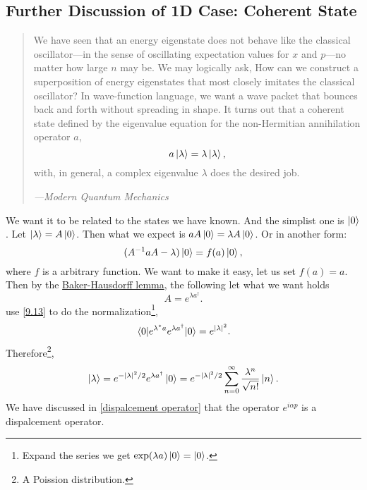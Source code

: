 \documentclass{article}
\theoremstyle{1}
\begin{document}
\subsection{Further Discussion of 1D Case: Coherent State}
\begin{quotation}
    We have seen that an energy eigenstate does not behave like the classical
oscillator—in the sense of oscillating expectation values for $x$ and $p$—no matter
how large $n$ may be. We may logically ask, How can we construct a superposition
of energy eigenstates that most closely imitates the classical oscillator? In wave-function language, we want a wave packet that bounces back and forth without
spreading in shape. It turns out that a coherent state defined by the eigenvalue
equation for the non-Hermitian annihilation operator $a$,
$$a\ket{\lambda}=\lambda\ket{\lambda},$$
with, in general, a complex eigenvalue $\lambda$ does the desired job. 
\begin{flushright}
    {\raggedleft \textit{---Modern Quantum Mechanics}}
\end{flushright}
\end{quotation}
We want it to be related to the states we have known. And the simplist one is $\ket{0}$. Let $\ket{\lambda}=A\ket{0}$. Then what we expect is $aA\ket{0}=\lambda A\ket{0}$. Or in another form:
\begin{equation*}
    (A^{-1}aA-\lambda)\ket{0}=f(a)\ket{0},
\end{equation*}
where $f$ is a arbitrary function. We want to make it easy, let us set $f(a)=a$. Then by the \hyperref[Baker-Hausdorff lemma]{Baker-Hausdorff lemma}, the following let what we want holds
\begin{equation}
    A=e^{\lambda a^\dagger}.
\end{equation}
use \eqref{9.13} to do the normalization\footnote{Expand the series we get $\exp(\lambda a)\ket{0}=\ket{0}$.},
\begin{equation}
    \expval{e^{\lambda^* a}e^{\lambda a^\dagger}}{0}=e^{\left|\lambda\right|^2}.
\end{equation}
Therefore\footnote{A Poission distribution.},
\begin{equation}
    \ket{\lambda}=e^{-\left|\lambda\right|^2/2}e^{\lambda a^\dagger}\ket{0}=e^{-\left|\lambda\right|^2/2}\sum_{n=0}^{\infty}\frac{\lambda^n}{\sqrt{n!}}\ket{n}.
\end{equation}
We have discussed in \ref{dispalcement operator} that the operator $e^{i \alpha p}$ is a dispalcement operator.
\end{document}
